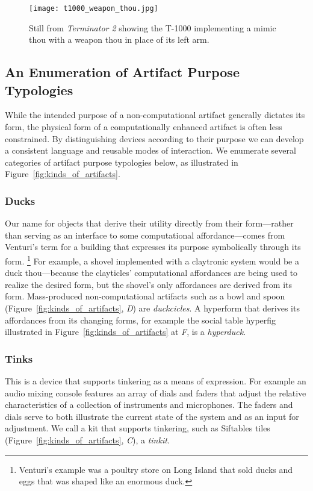 \begin{figure}[]
  \centering
    \texttt{[image: t1000\_weapon\_thou.jpg]}
  \caption{Still from \emph{Terminator 2} showing the T-1000 implementing a mimic thou with a weapon thou in place of its left arm.}
  \label{fig:t1000_weapon_thou}
\end{figure}

\subsection{An Enumeration of Artifact Purpose Typologies} %
%
While the intended purpose of a non-computational artifact generally dictates its form, the physical form of a computationally enhanced artifact is often less constrained. 
By distinguishing devices according to their purpose we can develop a consistent language and reusable modes of interaction. 
We enumerate several categories of artifact purpose typologies below, as illustrated in Figure~\ref{fig:kinds_of_artifacts}. 

\subsubsection{Ducks}
Our name for objects that derive their utility directly from their form---rather than serving as an interface to some computational affordance---comes from Venturi's term \citeyearpar{venturi_vegas} for a building that expresses its purpose symbolically through its form.%
\footnote{Venturi's example was a poultry store on Long Island that sold ducks and eggs that was shaped like an enormous duck.}
For example, a shovel implemented with a claytronic system would be a duck thou---because the clayticles' computational affordances are being used to realize the desired form, but the shovel's only affordances are derived from its form. 
Mass-produced non-computational artifacts such as a bowl and spoon (Figure~\ref{fig:kinds_of_artifacts}, \emph{D}) are \emph{duckcicles}. 
A hyperform that derives its affordances from its changing forms, for example the social table hyperfig illustrated in Figure~\ref{fig:kinds_of_artifacts} at \emph{F}, is a \emph{hyperduck}.

\subsubsection{Tinks}
This is a device that supports tinkering as a means of expression. For example an audio mixing console features an array of dials and faders that adjust the relative characteristics of a collection of instruments and microphones. 
The faders and dials serve to both illustrate the current state of the system and as an input for adjustment. 
We call a kit that supports tinkering, such as Siftables tiles \citep{siftables} (Figure~\ref{fig:kinds_of_artifacts}, \emph{C}), a \emph{tinkit}. 

